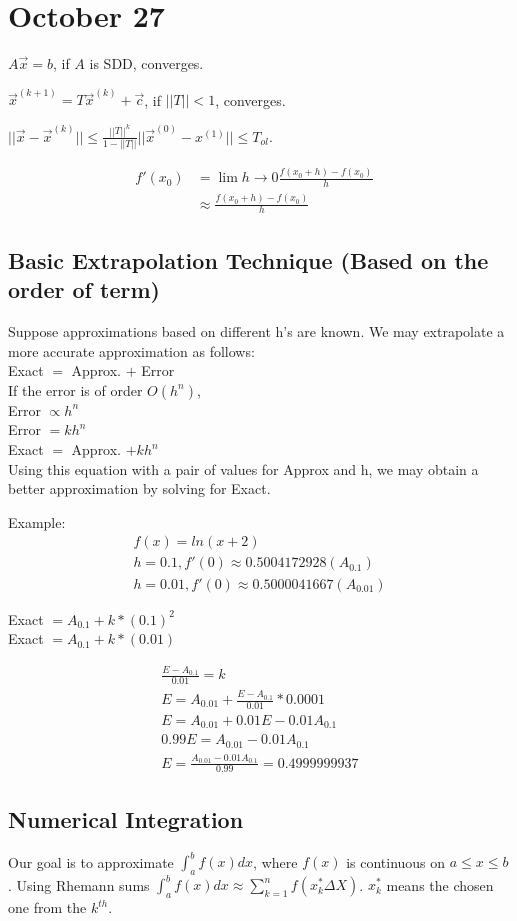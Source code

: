 \section{October 27}

	$A\vec{x} = b$, if $A$ is SDD, converges.

	$\vec{x}^{(k+1)} = T\vec{x}^{(k)} + \vec{c}$, if $||T|| < 1$, converges.

	$||\vec{x} - \vec{x}^{(k)}|| \leq
	\frac{||T||^{k}}{1-||T||}||\vec{x}^{(0)}-x^{(1)}|| \leq T_{ol}$.

	\begin{align}
		f'(x_{0}) &= \lim{h \to 0} \frac{f(x_{0}+h)-f(x_{0})}{h}& \\
		&\approx \frac{f(x_{0} + h) - f(x_{0})}{h}&
	\end{align}

	\subsection{Basic Extrapolation Technique (Based on the order of term)}
		Suppose approximations based on different h's are known. We may extrapolate a more accurate approximation as follows: \\
		Exact $=$ Approx. $+$ Error \\
		If the error is of order $O(h^{n})$, \\
		Error $\propto h^{n}$ \\
		Error $= kh^{n}$ \\
		Exact $=$ Approx. $+ kh^{n}$ \\
		Using this equation with a pair of values for Approx and h, we may obtain a better approximation by solving for Exact.

		Example:
		\begin{align}
				f(x) = ln(x+2) \\
				h = 0.1, f'(0) \approx 0.5004172928 (A_{0.1}) \\
				h = 0.01, f'(0) \approx 0.5000041667 (A_{0.01})
		\end{align}

		Exact $= A_{0.1} + k*(0.1)^{2}$ \\
		Exact $= A_{0.1} + k*(0.01)$

		\begin{align}
			\frac{E - A_{0.1}}{0.01} = k \\
			E = A_{0.01} + \frac{E - A_{0.1}}{0.01}*0.0001 \\
			E = A_{0.01} + 0.01E - 0.01A_{0.1} \\
			0.99E = A_{0.01} - 0.01A_{0.1} \\
			E = \frac{A_{0.01} - 0.01A_{0.1}}{0.99} = 0.4999999937
		\end{align}

	\subsection{Numerical Integration}
		Our goal is to approximate $\int_{a}^{b} f(x) dx$, where $f(x)$ is continuous on $a \leq x \leq b$. Using Rhemann sums $\int_{a}^{b} f(x) dx \approx \sum_{k=1}^{n} f(x_{k}^{*} \Delta X)$. $x_{k}^{*}$ means the chosen one from the $k^{th}$.
